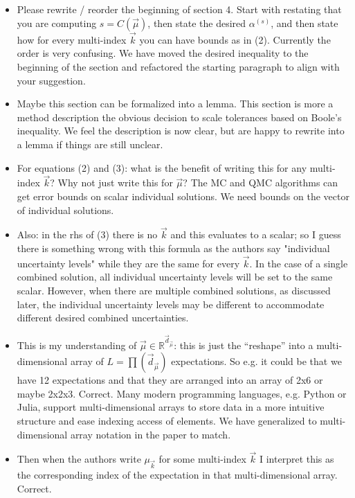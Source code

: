 \documentclass{article}[12pt]
\newcommand{\Referee}[1]{{\color{blue} #1 \newline}}
\begin{document}
\begin{itemize}
    \item \Referee{Please rewrite / reorder the beginning of section 4. Start with restating that you are computing $s = C(\vec{\mu})$, then state the desired $\alpha^{(s)}$, and then state how for every multi-index $\vec{k}$ you can have bounds as in (2). Currently the order is very confusing.} We have moved the desired inequality to the beginning of the section and refactored the starting paragraph to align with your suggestion. 
    \item \Referee{Maybe this section can be formalized into a lemma.}This section is more a method description the obvious decision to scale tolerances based on Boole's inequality. We feel the description is now clear, but are happy to rewrite into a lemma if things are still unclear.   
    \item \Referee{For equations (2) and (3): what is the benefit of writing this for any multi-index $\vec{k}$? Why not just write this for $\vec{\mu}$?} The MC and QMC algorithms can get error bounds on scalar individual solutions. We need bounds on the vector of individual solutions. 
    \item \Referee{Also: in the rhs of (3) there is no $\vec{k}$ and this evaluates to a scalar; so I guess there is something wrong with this formula as the authors say "individual uncertainty levels" while they are the same for every $\vec{k}$.}In the case of a single combined solution, all individual uncertainty levels will be set to the same scalar. However, when there are multiple combined solutions, as discussed later, the individual uncertainty levels may be different to accommodate different desired combined uncertainties.  
    \item \Referee{This is my understanding of $\vec{\mu} \in \mathbb{R}^{\vec{d}_{\vec{\mu}}}$: this is just the ``reshape'' into a multi-dimensional array of $L = \prod(\vec{d}_{\vec{\mu}})$ expectations. So e.g. it could be that we have 12 expectations and that they are arranged into an array of 2x6 or maybe 2x2x3.}Correct. Many modern programming languages, e.g. Python or Julia, support multi-dimensional arrays to store data in a more intuitive structure and ease indexing access of elements. We have generalized to multi-dimensional array notation in the paper to match. 
    \item \Referee{Then when the authors write $\mu_{\vec{k}}$ for some multi-index $\vec{k}$ I interpret this as the corresponding index of the expectation in that multi-dimensional array.}Correct. 

\end{itemize}
\end{document}
